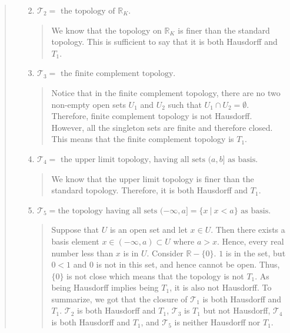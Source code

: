 \documentclass[12pt, a4paper]{article}
\newcommand{\reals}{\mathbb{R}} %
\newcommand{\topology}{\mathcal{T}} %
\begin{document}
\begin{itemize}
\begin{itemize}
\begin{quote}
\begin{itemize}
\item[]

\item[2.]
$\topology_2 = \mbox{ the topology of $\reals_K$.}$
\begin{quote}
We know that the topology on $\reals_K$ is finer than
the standard topology. This is sufficient to say that
it is both Hausdorff and $T_1$.
\end{quote}

\item[]

\item[3.]
$\topology_3 = \mbox{ the finite complement topology.}$
\begin{quote}
Notice that in the finite complement topology, there are no two non-empty open sets $U_1$ and $U_2$ such that $U_1 \cap U_2 = \emptyset$. Therefore, finite complement topology is not
Hausdorff. However, all the singleton sets are finite and therefore closed. This means that the finite complement topology is $T_1$.

\end{quote}

\item[]

\item[4.]
$\topology_4 = \mbox{ the upper limit topology, having all sets $(a, b]$ as basis.}$
\begin{quote}
We know that the upper limit topology is finer than the standard topology. Therefore, it is both Hausdorff and $T_1$.
\end{quote}

\item[]

\item[5.]
$\topology_5 = \mbox{the topology having all sets }(-\infty, a] = \{x \ | \ x < a\} \mbox{ as basis.}$
\begin{quote}
Suppose that $U$ is an open set and let $x \in U$. Then there exists a basis element $x \in (-\infty, a) \subset U$
where $a > x$. Hence, every real number less than $x$
is in $U$. Consider $\reals - \{0\}$. $1$ is in the set,
but $0 < 1$ and $0$ is not in this set, and hence cannot be
open. Thus, $\{0\}$ is not close which means that the topology is not $T_1$. As being Hausdorff implies being $T_1$,
it is also not Hausdorff.
\newline
\newline
To summarize, we got that the closure of $\topology_1$ is both Hausdorff and $T_1$. $\topology_2$ is both Hausdorff and $T_1$, $\topology_3$ is $T_1$ but not Hausdorff, $\topology_4$ is both Hausdorff and $T_1$, and $\topology_5$ is neither Hausdorff nor $T_1$.
\end{quote}
\end{itemize}
\end{quote}
\end{itemize}


\end{itemize}
\end{document}
